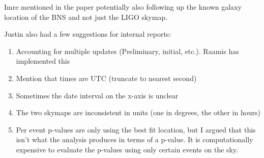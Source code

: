 Imre mentioned in the paper potentially also following up the known galaxy location of the BNS and not just the LIGO skymap. 

Justin also had a few suggestions for internal reports: 

\begin{enumerate}
    \itemsep-0.75em 
    \item Accounting for multiple updates (Preliminary, initial, etc.). Raamis has implemented this
    \item Mention that times are UTC (truncate to nearest second)
    \item Sometimes the date interval on the x-axis is unclear
    \item The two skymaps are inconsistent in units (one in degrees, the other in hours)
    \item Per event p-values are only using the best fit location, but I argued that this isn't what the analysis produces in terms of a p-value. It is computationally expensive to evaluate the p-values using only certain events on the sky.
\end{enumerate}